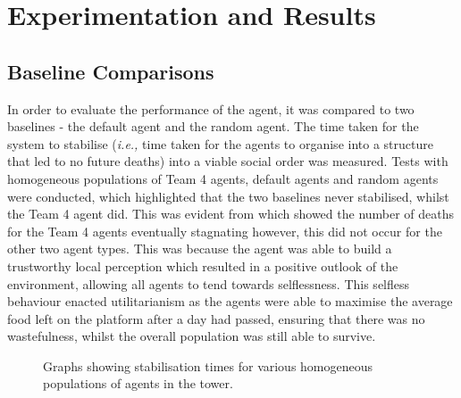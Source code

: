\section{Experimentation and Results}

\subsection{Baseline Comparisons}
In order to evaluate the performance of the agent, it was compared to two baselines - the default agent and the random agent. The time taken for the system to stabilise (\emph{i.e.,} time taken for the agents to organise into a structure that led to no future deaths) into a viable social order was measured. Tests with homogeneous populations of Team 4 agents, default agents and random agents were conducted, which highlighted that the two baselines never stabilised, whilst the Team 4 agent did. This was evident from  which showed the number of deaths for the Team 4 agents eventually stagnating however, this did not occur for the other two agent types. This was because the agent was able to build a trustworthy local perception which resulted in a positive outlook of the environment, allowing all agents to tend towards selflessness. This selfless behaviour enacted utilitarianism as the agents were able to maximise the average food left on the platform after a day had passed, ensuring that there was no wastefulness, whilst the overall population was still able to survive. 

\begin{figure}[htb]%
    \centering
    \qquad
    \qquad
    \caption{Graphs showing stabilisation times for various homogeneous populations of agents in the tower.}%
    \label{fig:baselinecomps}%
\end{figure}

